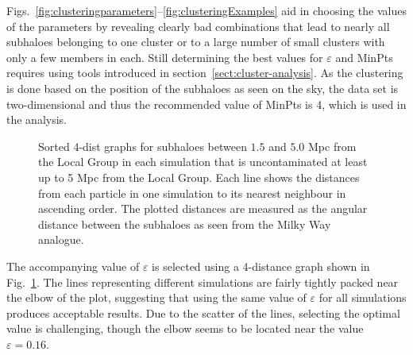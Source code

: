 \documentclass[english, oneside]{HYgradu}
\begin{document}
Figs.~\ref{fig:clusteringparameters}--\ref{fig:clusteringExamples} aid in choosing the values of the parameters by revealing clearly bad combinations that lead to nearly all subhaloes belonging to one cluster or to a large number of small clusters with only a few members in each. Still determining the best values for $\varepsilon$ and MinPts requires using tools introduced in section~\ref{sect:cluster-analysis}. As the clustering is done based on the position of the subhaloes as seen on the sky, the data set is two-dimensional and thus the recommended value of MinPts is 4, which is used in the analysis.

\begin{figure}
    \centering
    
    \caption{Sorted 4-dist graphs for subhaloes between $1.5$ and $5.0$ Mpc from the Local Group in each simulation that is uncontaminated at least up to 5 Mpc from the Local Group. Each line shows the distances from each particle in one simulation to its  nearest neighbour in ascending order. The plotted distances are measured as the angular distance between the subhaloes as seen from the Milky Way analogue. %
    }\label{fig:4-distances}
\end{figure}

The accompanying value of $\varepsilon$ is selected using a 4-distance graph shown in Fig.~\ref{fig:4-distances}. The lines representing different simulations are fairly tightly packed near the elbow of the plot, suggesting that using the same value of $\varepsilon$ for all simulations produces acceptable results. Due to the scatter of the lines, selecting the optimal value is challenging, though the elbow seems to be located near the value $\varepsilon = 0.16$.
\end{document}
